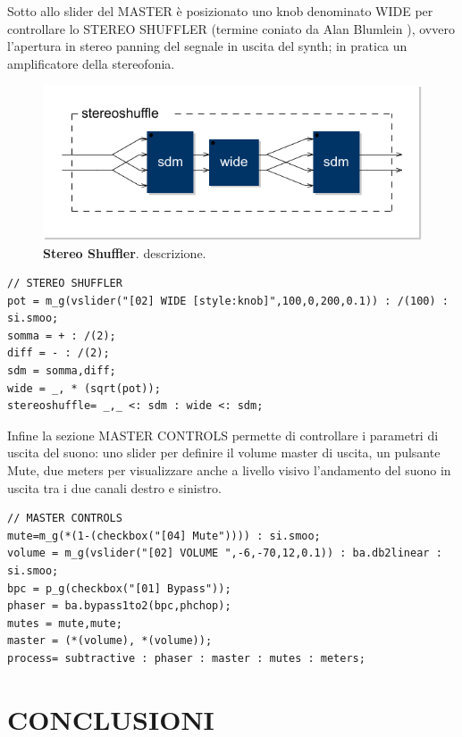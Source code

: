 \documentclass[
	a4paper,
	twocolumn
	]{article}
\begin{document}
Sotto allo slider del MASTER è posizionato uno knob denominato WIDE per
controllare lo STEREO SHUFFLER (termine coniato da Alan Blumlein \cite{ab58} ),
ovvero l'apertura in stereo panning del segnale in uscita del synth; in pratica
un amplificatore della stereofonia.

\begin{figure}[b]%
\begin{center}
\includegraphics[width=.47\textwidth]{img/mid-side-shuffler.pdf}
\caption{\textbf{Stereo Shuffler}. descrizione.}
\label{shuff}
\end{center}
\end{figure}

\begin{lstlisting}
// STEREO SHUFFLER
pot = m_g(vslider("[02] WIDE [style:knob]",100,0,200,0.1)) : /(100) : si.smoo;
somma = + : /(2);
diff = - : /(2);
sdm = somma,diff;
wide = _, * (sqrt(pot));
stereoshuffle= _,_ <: sdm : wide <: sdm;
\end{lstlisting}

Infine la sezione MASTER CONTROLS permette di controllare i parametri di uscita
del suono: uno slider per definire il volume master di uscita, un pulsante Mute,
due meters per visualizzare anche a livello visivo l'andamento del suono in
uscita tra i due canali destro e sinistro.

\begin{lstlisting}
// MASTER CONTROLS
mute=m_g(*(1-(checkbox("[04] Mute")))) : si.smoo;
volume = m_g(vslider("[02] VOLUME ",-6,-70,12,0.1)) : ba.db2linear : si.smoo;
bpc = p_g(checkbox("[01] Bypass"));
phaser = ba.bypass1to2(bpc,phchop);
mutes = mute,mute;
master = (*(volume), *(volume));
process= subtractive : phaser : master : mutes : meters;
\end{lstlisting}

\section*{CONCLUSIONI}
\end{document}
